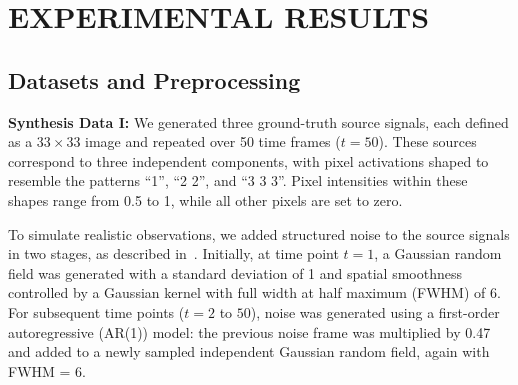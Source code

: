 \documentclass{article}
\begin{document}

\section{EXPERIMENTAL RESULTS}
\label{sec:res}
\subsection{Datasets and Preprocessing}
\hspace{1.2em} \textbf{Synthesis Data I:} We generated three ground-truth source signals, each defined as a \(33 \times 33\) image and repeated over 50 time frames (\(t = 50\)). These sources correspond to three independent components, with pixel activations shaped to resemble the patterns “1”, “2 2”, and “3 3 3”. Pixel intensities within these shapes range from 0.5 to 1, while all other pixels are set to zero.

To simulate realistic observations, we added structured noise to the source signals in two stages, as described in~\cite{risk2021simultaneous,wang2024sparse}. Initially, at time point \(t = 1\), a Gaussian random field was generated with a standard deviation of 1 and spatial smoothness controlled by a Gaussian kernel with full width at half maximum (FWHM) of 6. For subsequent time points (\(t = 2\) to \(50\)), noise was generated using a first-order autoregressive (AR(1)) model: the previous noise frame was multiplied by 0.47 and added to a newly sampled independent Gaussian random field, again with FWHM = 6.
\end{document}
